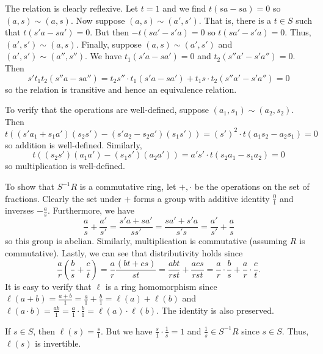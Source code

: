 \documentclass[../../master.tex]{subfiles}
\begin{document}
    \begin{solution}
        The relation is clearly reflexive. Let $t = 1$ and we find $t(sa - sa) =
        0$ so $(a, s) \sim (a, s)$. Now suppose $(a, s) \sim (a', s')$. That is,
        there is a $t \in S$ such that $t(s'a - sa') = 0$. But then $-t(sa' -
        s'a) = 0$ so $t(sa' - s'a) = 0$. Thus, $(a', s') \sim (a, s)$. Finally,
        suppose $(a, s) \sim (a', s')$ and $(a', s') \sim (a'', s'')$. We have
        $t_1 (s'a - sa') = 0$ and $t_2 (s''a' - s'a'') = 0$. Then
        \[
            s' t_1 t_2 (s''a - sa'') = t_2 s'' \cdot t_1 (s'a - sa') + t_1 s
            \cdot t_2 (s''a' - s'a'') = 0
        \] 
        so the relation is transitive and hence an equivalence relation.

        To verify that the operations are well-defined, suppose $(a_1, s_1) \sim
        (a_2, s_2)$. Then
        \[
            t\left((s'a_1 + s_1a')(s_2s') - (s'a_2 - s_2a')(s_1s')\right) =
            (s')^2 \cdot t(a_1s_2 - a_2s_1) = 0
        \] 
        so addition is well-defined. Similarly,
        \[
            t\left((s_2s')(a_1a') - (s_1s')(a_2a')\right) = a's' \cdot t(s_2a_1
            - s_1a_2) = 0
        \] 
        so multiplication is well-defined.

        To show that $S^{-1}R$ is a commutative ring, let $+, \cdot$ be the
        operations on the set of fractions. Clearly the set under $+$ forms a
        group with additive identity $\frac{0}{1}$ and inverses
        $-\frac{a}{s}$. Furthermore, we have
        \[
        \frac{a}{s} + \frac{a'}{s'} = \frac{s'a + sa'}{ss'} = \frac{sa' +
        s'a}{s's} = \frac{a'}{s'} + \frac{a}{s}
        \] 
        so this group is abelian. Similarly, multiplication is commutative
        (assuming $R$ is commutative). Lastly, we can see that distributivity
        holds since
        \[
            \frac{a}{r}\left(\frac{b}{s} + \frac{c}{t}\right) = \frac{a}{r}
            \frac{(bt + cs)}{st} = \frac{abt}{rst} + \frac{acs}{rst} =
            \frac{a}{r} \cdot \frac{b}{s} + \frac{a}{r} \cdot \frac{c}{t}.
        \] 
        It is easy to verify that $\ell$ is a ring homomorphism since $\ell(a +
        b) = \frac{a + b}{1} = \frac{a}{1} + \frac{b}{1} = \ell(a) + \ell(b)$
        and $\ell(a \cdot b) = \frac{ab}{1} = \frac{a}{1} \cdot \frac{b}{1} =
        \ell(a) \cdot \ell(b)$. The identity is also preserved.

        If $s \in S$, then $\ell(s) = \frac{s}{1}$. But we have $\frac{s}{1}
        \cdot \frac{1}{s} = 1$ and $\frac{1}{s} \in S^{-1}R$ since $s \in S$.
        Thus, $\ell(s)$ is invertible.


\end{solution}
\end{document}
